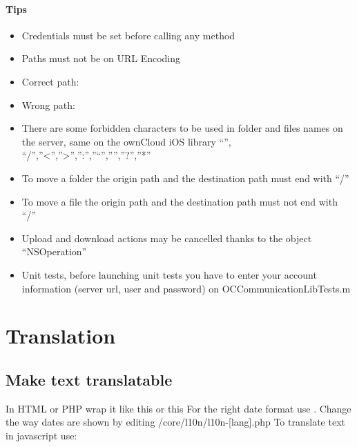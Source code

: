 \documentclass[letterpaper,10pt,english]{sphinxmanual}
\begin{document}
\paragraph{Tips}
\label{ios_library/examples:tips}\begin{itemize}
\item {} 
Credentials must be set before calling any method

\item {} 
Paths must not be on URL Encoding

\item {} 
Correct path: 

\item {} 
Wrong path: 

\item {} 
There are some forbidden characters to be used in folder and files names on the server, same on the ownCloud iOS library ``'', ``/'',''\textless{}'',''\textgreater{}'','':'',''``'','''',''?'',''*''

\item {} 
To move a folder the origin path and the destination path must end with “/”

\item {} 
To move a file the origin path and the destination path must not end with “/”

\item {} 
Upload and download actions may be cancelled thanks to the object “NSOperation”

\item {} 
Unit tests, before launching unit tests you have to enter your account information (server url, user and password) on OCCommunicationLibTests.m

\end{itemize}
\label{core/index:coreindex}

\section{Translation}
\label{core/translation:translation}\label{core/translation::doc}

\subsection{Make text translatable}
\label{core/translation:make-text-translatable}
In HTML or PHP wrap it like this  or this 
For the right date format use . Change the way dates are shown by editing /core/l10n/l10n-{[}lang{]}.php
To translate text in javascript use: 
\end{document}
